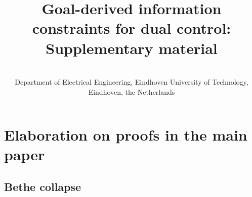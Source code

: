 \documentclass{l4dc2027}
\title[Supplementary material]{Goal-derived information constraints for dual control:\\ Supplementary material}
\author{%
 \Name{Wouter M. Kouw} \Email{w.m.kouw@tue.nl}\\
 \addr Department of Electrical Engineering, Eindhoven University of Technology, Eindhoven, the Netherlands%
}
\begin{document}
\maketitle

\def\presectionnum{}
\renewcommand{\thesection}{S\arabic{section}}
\renewcommand{\theequation}{S\arabic{equation}}
\renewcommand{\thefigure}{S\arabic{figure}}
\renewcommand{\thetable}{S\arabic{table}}
\renewcommand{\thetheorem}{S\arabic{theorem}}
\renewcommand{\theHsection}{S\arabic{section}}
\renewcommand{\theHequation}{S\arabic{equation}}
\renewcommand{\theHfigure}{S\arabic{figure}}
\renewcommand{\theHtable}{S\arabic{table}}
\def\theHtheorem{S\arabic{theorem}}


\section{Elaboration on proofs in the main paper}

\subsection{Bethe collapse}\label{supp:collapse}
\end{document}
